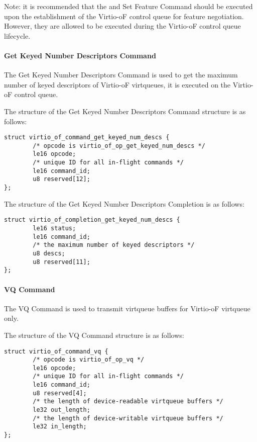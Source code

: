Note: it is recommended that the
and Set Feature Command should be executed upon the establishment of the Virtio-oF control queue for feature negotiation.
However, they are allowed to be executed during the Virtio-oF control queue lifecycle.

\paragraph{Get Keyed Number Descriptors Command}\label{sec:Virtio Transport Options / Virtio Over Fabrics / Commands Definition / Opcodes / Get Keyed Number Descriptors Command}
The Get Keyed Number Descriptors Command is used to get the maximum number of keyed descriptors of Virtio-oF virtqueues, it is executed on the Virtio-oF control queue.

The structure of the Get Keyed Number Descriptors Command structure is as follows:
\begin{lstlisting}
struct virtio_of_command_get_keyed_num_descs {
        /* opcode is virtio_of_op_get_keyed_num_descs */
        le16 opcode;
        /* unique ID for all in-flight commands */
        le16 command_id;
        u8 reserved[12];
};
\end{lstlisting}

The structure of the Get Keyed Number Descriptors Completion is as follows:
\begin{lstlisting}
struct virtio_of_completion_get_keyed_num_descs {
        le16 status;
        le16 command_id;
        /* the maximum number of keyed descriptors */
        u8 descs;
        u8 reserved[11];
};
\end{lstlisting}

\paragraph{VQ Command}\label{sec:Virtio Transport Options / Virtio Over Fabrics / Commands Definition / Opcodes / VQ Command}
The VQ Command is used to transmit virtqueue buffers for Virtio-oF virtqueue only.

The structure of the VQ Command structure is as follows:
\begin{lstlisting}
struct virtio_of_command_vq {
        /* opcode is virtio_of_op_vq */
        le16 opcode;
        /* unique ID for all in-flight commands */
        le16 command_id;
        u8 reserved[4];
        /* the length of device-readable virtqueue buffers */
        le32 out_length;
        /* the length of device-writable virtqueue buffers */
        le32 in_length;
};
\end{lstlisting}

